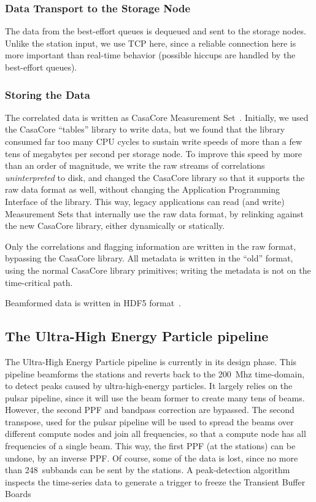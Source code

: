 \subsubsection{Data Transport to the Storage Node}

The data from the best-effort queues is dequeued and sent to the storage nodes.
Unlike the station input, we use TCP here, since a reliable connection here
is more important than real-time behavior (possible hiccups are handled by
the best-effort queues).


\subsubsection{Storing the Data}

The correlated data is written as CasaCore Measurement Set~\cite{Kemball:00}.
Initially, we used the CasaCore ``tables'' library to write data, but we
found that the library consumed far too many CPU cycles to sustain write
speeds of more than a few tens of megabytes per second per storage node.
To improve this speed by more than an order of magnitude, we write the
raw streams of correlations \emph{uninterpreted\/} to disk, and changed
the CasaCore library so that it supports the raw data format as well,
without changing the Application Programming Interface of the library.
This way, legacy applications can read (and write) Measurement Sets that
internally use the raw data format, by relinking against the new CasaCore
library, either dynamically or statically.

Only the correlations and flagging information are written in the raw
format, bypassing the CasaCore library.
All metadata is written in the ``old'' format, using the normal CasaCore
library primitives; writing the metadata is not on the time-critical path.

Beamformed data is written in HDF5 format~\cite{?}.



\subsection{The Ultra-High Energy Particle pipeline}

The Ultra-High Energy Particle pipeline is currently in its design phase.
This pipeline beamforms the stations and reverts back to the 200~Mhz
time-domain, to detect peaks caused by ultra-high-energy particles.
It largely relies on the pulsar pipeline, since it will use the beam former
to create many tens of beams.
However, the second PPF and bandpass correction are bypassed.
The second transpose, used for the pulsar pipeline will be used to spread the
beams over different compute nodes and join all frequencies, so that a compute
node has all frequencies of a single beam.
This way, the first PPF (at the stations) can be undone, by an inverse PPF.
Of course, some of the data is lost, since no more than 248~subbands can be
sent by the stations.
A peak-detection algorithm inspects the time-series data to generate a trigger
to freeze the Transient Buffer Boards~\cite{Kooistra:10}



